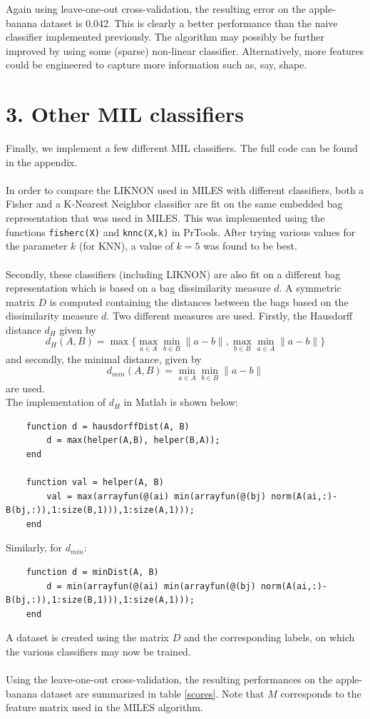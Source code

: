 \documentclass [a4paper] {report}
\begin{document}
	\noindent
	 Again using leave-one-out cross-validation, the resulting error on the apple-banana dataset is 0.042. This is clearly a better performance than the naive classifier implemented previously. The algorithm may possibly be further improved by using some (sparse) non-linear classifier. Alternatively, more features could be engineered to capture more information such as, say, shape.

	\newpage
	\section*{3. Other MIL classifiers}
	Finally, we implement a few different MIL classifiers. The full code can be found in the appendix. \\\\
	In order to compare the LIKNON used in MILES with different classifiers, both a Fisher and a K-Nearest Neighbor classifier are fit on the same embedded bag representation that was used in MILES. This was implemented using the functions \texttt{fisherc(X)} and \texttt{knnc(X,k)} in PrTools. After trying various values for the parameter $k$ (for KNN), a value of $k=5$ was found to be best.\\\\
	Secondly, these classifiers (including LIKNON) are also fit on a different bag representation which is based on a bag dissimilarity measure $d$. A symmetric matrix $D$ is computed containing the distances between the bags based on the dissimilarity measure $d$. Two different measures are used. Firstly, the Hausdorff distance $d_{H}$ given by
	$$ d_{H}(A,B) = \max \{\max_{a\in A} \min_{b\in B} \|a-b\|, \max_{b\in B} \min_{a\in A} \|a-b\| \} $$
	and secondly, the minimal distance, given by
	$$ d_{min}(A,B) = \min_{a \in A} \min_{b \in B} \|a-b\| $$
	are used. \\
	The implementation of $d_{H}$ in Matlab is shown below:
	\begin{lstlisting}
	function d = hausdorffDist(A, B)
		d = max(helper(A,B), helper(B,A));
	end
	
	function val = helper(A, B)
		val = max(arrayfun(@(ai) min(arrayfun(@(bj) norm(A(ai,:)-B(bj,:)),1:size(B,1))),1:size(A,1)));
	end
	\end{lstlisting}
	Similarly, for $d_{min}$:
	\begin{lstlisting}
	function d = minDist(A, B)
		d = min(arrayfun(@(ai) min(arrayfun(@(bj) norm(A(ai,:)-B(bj,:)),1:size(B,1))),1:size(A,1)));
	end
	\end{lstlisting}
	A dataset is created using the matrix $D$ and the corresponding labels, on which the various classifiers may now be trained.\\\\
	Using the leave-one-out cross-validation, the resulting performances on the apple-banana dataset are summarized in table \ref{scores}. Note that $M$ corresponds to the feature matrix used in the MILES algorithm.
	
\end{document}

